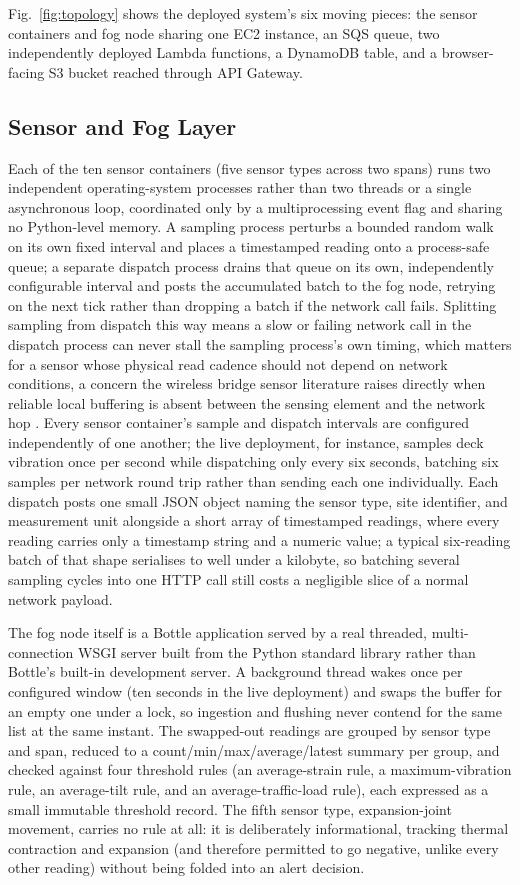\documentclass[conference]{IEEEtran}
\begin{document}
Fig.~\ref{fig:topology} shows the deployed system's six moving pieces: the sensor containers and fog node sharing one EC2 instance, an SQS queue, two independently deployed Lambda functions, a DynamoDB table, and a browser-facing S3 bucket reached through API Gateway.

\subsection{Sensor and Fog Layer}

Each of the ten sensor containers (five sensor types across two spans) runs two independent operating-system processes rather than two threads or a single asynchronous loop, coordinated only by a multiprocessing event flag and sharing no Python-level memory. A sampling process perturbs a bounded random walk on its own fixed interval and places a timestamped reading onto a process-safe queue; a separate dispatch process drains that queue on its own, independently configurable interval and posts the accumulated batch to the fog node, retrying on the next tick rather than dropping a batch if the network call fails. Splitting sampling from dispatch this way means a slow or failing network call in the dispatch process can never stall the sampling process's own timing, which matters for a sensor whose physical read cadence should not depend on network conditions, a concern the wireless bridge sensor literature raises directly when reliable local buffering is absent between the sensing element and the network hop \cite{ref2}. Every sensor container's sample and dispatch intervals are configured independently of one another; the live deployment, for instance, samples deck vibration once per second while dispatching only every six seconds, batching six samples per network round trip rather than sending each one individually. Each dispatch posts one small JSON object naming the sensor type, site identifier, and measurement unit alongside a short array of timestamped readings, where every reading carries only a timestamp string and a numeric value; a typical six-reading batch of that shape serialises to well under a kilobyte, so batching several sampling cycles into one HTTP call still costs a negligible slice of a normal network payload.

The fog node itself is a Bottle application served by a real threaded, multi-connection WSGI server built from the Python standard library rather than Bottle's built-in development server. A background thread wakes once per configured window (ten seconds in the live deployment) and swaps the buffer for an empty one under a lock, so ingestion and flushing never contend for the same list at the same instant. The swapped-out readings are grouped by sensor type and span, reduced to a count/min/max/average/latest summary per group, and checked against four threshold rules (an average-strain rule, a maximum-vibration rule, an average-tilt rule, and an average-traffic-load rule), each expressed as a small immutable threshold record. The fifth sensor type, expansion-joint movement, carries no rule at all: it is deliberately informational, tracking thermal contraction and expansion (and therefore permitted to go negative, unlike every other reading) without being folded into an alert decision.
\end{document}
